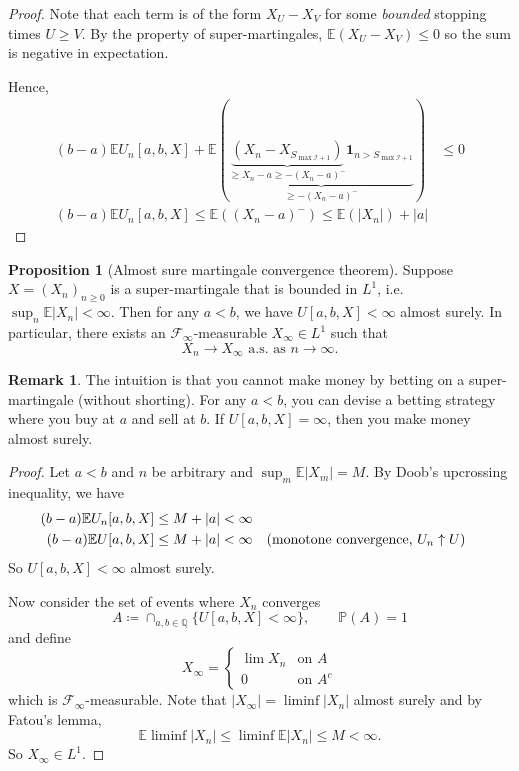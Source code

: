 \documentclass[parskip=full]{article}
\theoremstyle{definition}
\newtheorem{proposition}{Proposition}[section]
\newtheorem*{remark}{Remark}
\newcommand{\Q}{\mathbb{Q}}
\newcommand{\Pbb}{\mathbb{P}}
\newcommand{\1}{\mathbbm{1}}
\newcommand{\E}{\mathbb{E}}
\begin{document}
\begin{proof}
  Note that each term is of the form $X_U - X_V$ for some \emph{bounded} stopping times $U \geq V$. By the property of super-martingales, $\E(X_U - X_V) \leq 0$ so the sum is negative in expectation.

  Hence, 
  \begin{align*}
    (b - a) \E U_n[a, b, X] + \E(\underbrace{\underbrace{(X_n - X_{S_{\max \mathcal{I} + 1}})}_{
      \geq X_n - a \geq -(X_n - a)^-} \mathbf{1}_{n > S_{\max \mathcal{I} + 1}}}_{\geq -(X_n - a)^-}) &\leq 0 \\
    (b - a) \E U_n[a, b, X]  \leq  \E((X_n - a)^-) \leq \E(|X_n|) + |a|
  \end{align*}
\end{proof}

\begin{proposition}[Almost sure martingale convergence theorem] \label{almost sure martingale convergence theorem}
  Suppose $X = (X_n)_{n \geq 0}$ is a super-martingale that is bounded in $L^1$, i.e.\ $\sup_n \E|X_n| < \infty$. Then for any $a < b$, we have $U[a, b, X] < \infty$ almost surely. In particular, there exists an $\mathcal{F}_\infty$-measurable $X_\infty \in L^1$ such that
  \[
    X_n \to X_\infty\text{ a.s. as }n \to \infty.
  \]
\end{proposition}

\begin{remark}
  The intuition is that you cannot make money by betting on a super-martingale (without shorting). For any $a < b$, you can devise a betting strategy where you buy at $a$ and sell at $b$. If $U[a, b, X] = \infty$, then you make money almost surely.
\end{remark}

\begin{proof}
  Let $a < b$ and $n$ be arbitrary and $\sup_m \E|X_m| = M$. By Doob's upcrossing inequality, we have
  \begin{align*}
    (b - a) \E U_n[a, b, X] & \leq M + |a| < \infty \\
    (b - a) \E U[a, b, X] & \leq M + |a| < \infty && \text{(monotone convergence, $ U_n \uparrow U$)}
  \end{align*}
  So $U[a, b, X] < \infty$ almost surely.

  Now consider the set of events where $X_n$ converges
  \[
    A \coloneqq \cap_{a, b \in \Q} \{U[a, b, X] < \infty\}, \qquad \Pbb (A) = 1
  \]
  and define
  \[
    X_\infty = \begin{cases}
      \lim X_n & \text{on } A \\
      0           & \text{on } A^c
    \end{cases}
  \]
  which is $\mathcal{F}_\infty$-measurable. Note that $|X_\infty| = \liminf |X_n|$ almost surely and by Fatou's lemma,
  \[
    \E \liminf |X_n| \leq \liminf \E|X_n| \leq M < \infty.
  \]
  So $X_\infty \in L^1$.
\end{proof}
\end{document}
